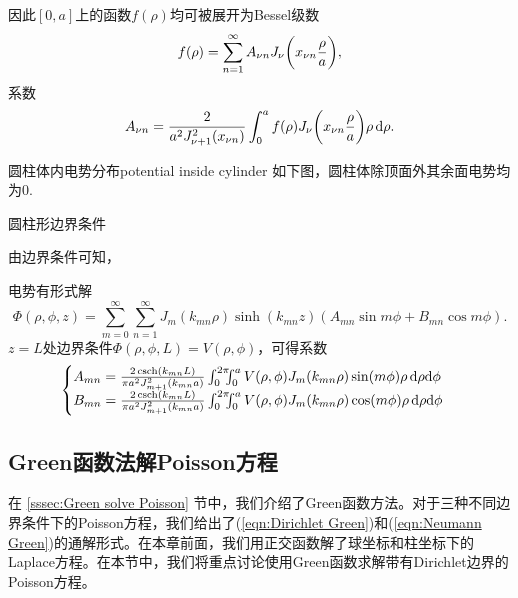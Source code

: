 因此$[0,a]$上的函数$f(\rho)$均可被展开为Bessel级数
\[
    f(\rho)=\sum_{n=1}^\infty A_{\nu n}J_\nu\biggkh{x_{\nu n}\frac\rho a},
\]
系数 
\[
    A_{\nu n}=\frac2{a^2J_{\nu+1}^2(x_{\nu n})}\int_0^af(\rho)J_\nu\biggkh{x_{\nu n}\frac\rho a}\rho\d\rho.
\]
\begin{example}{圆柱体内电势分布}{potential inside cylinder}
    如下图，圆柱体除顶面外其余面电势均为0.
    \begin{center}
        \tikzchap 圆柱形边界条件
    \end{center}
    由边界条件可知，

    电势有形式解
    \[
        \Phi(\rho,\phi,z)=\sum_{m=0}^\infty\sum_{n=1}^\infty J_m(k_{mn}\rho)\sinh(k_{mn}z)(A_{mn}\sin m\phi+B_{mn}\cos m\phi).
    \]
    $z=L$处边界条件$\Phi(\rho,\phi,L)=V(\rho,\phi)$，可得系数
    \[
        \begin{cases}
            A_{mn}=\frac{2\csch(k_{mn}L)}{\pi a^2J_{m+1}^2(k_{mn}a)}\int_0^{2\pi}\bs5\int_0^aV(\rho,\phi)J_m(k_{mn}\rho)\sin(m\phi)\rho\d\rho\nd\phi\\
            B_{mn}=\frac{2\csch(k_{mn}L)}{\pi a^2J_{m+1}^2(k_{mn}a)}\int_0^{2\pi}\bs5\int_0^aV(\rho,\phi)J_m(k_{mn}\rho)\cos(m\phi)\rho\d\rho\nd\phi
        \end{cases}
    \]
\end{example}
\subsection{Green函数法解Poisson方程}
在 \ref{sssec:Green solve Poisson} 节中，我们介绍了Green函数方法。对于三种不同边界条件下的Poisson方程，我们给出了(\ref{eqn:Dirichlet Green})和(\ref{eqn:Neumann Green})的通解形式。在本章前面，我们用正交函数解了球坐标和柱坐标下的Laplace方程。在本节中，我们将重点讨论使用Green函数求解带有Dirichlet边界的Poisson方程。

